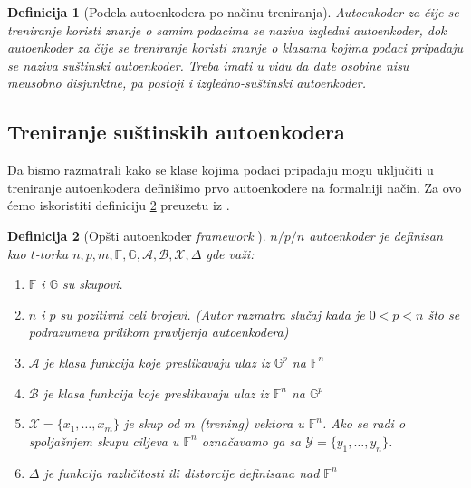 \documentclass{article}
\newtheorem{definition}{Definicija}
\begin{document}
	\begin{definition}[Podela autoenkodera po na\v cinu treniranja]
		\label{autoencoder-training-based-types}
		Autoenkoder za \v cije se treniranje koristi znanje o samim podacima se naziva \emph{izgledni autoenkoder}, dok autoenkoder za \v cije se treniranje koristi znanje o klasama kojima podaci pripadaju se naziva \emph{su\v stinski autoenkoder}. Treba imati u vidu da date osobine nisu me\dj usobno disjunktne, pa postoji i \emph{izgledno-su\v stinski autoenkoder}.
	\end{definition}


	\subsection{Treniranje su\v stinskih autoenkodera}
	\label{treniranje-sustinskih-autoenkodera}
	
	Da bismo razmatrali kako se klase kojima podaci pripadaju mogu uklju\v citi u treniranje autoenkodera defini\v simo prvo autoenkodere na formalniji na\v cin. 
	Za ovo \'cemo iskoristiti definiciju \ref{general-autoencoder-framework} preuzetu iz \cite[Poglavlje 2]{pmlr-v27-baldi12a}.
	
	\begin{definition}[Op\v sti autoenkoder \textit{framework} \cite{pmlr-v27-baldi12a}]
		\label{general-autoencoder-framework}
		\sloppy $n/p/n$ autoenkoder je definisan kao $t$-torka $n, p, m, \mathbb{F}, \mathbb{G}, \mathcal{A}, \mathcal{B}, \mathcal{X}, \Delta$ gde va\v zi:
		\begin{enumerate}
			\addtolength{\itemindent}{1em}
			\item $\mathbb{F}$ i $\mathbb{G}$ su skupovi.
			\item $n$ i $p$ su pozitivni celi brojevi. (Autor razmatra slu\v caj kada je $0 < p < n$ \v sto se podrazumeva prilikom pravljenja autoenkodera)
			\item $\mathcal{A}$ je klasa funkcija koje preslikavaju ulaz iz  $\mathbb{G}^p$ na $\mathbb{F}^n$
			\item $\mathcal{B}$ je klasa funkcija koje preslikavaju ulaz iz $\mathbb{F}^n$ na $\mathbb{G}^p$
			\item $\mathcal{X} = \{x_1, \ldots, x_m\}$ je skup od $m$ (trening) vektora u $\mathbb{F}^n$. Ako se radi o spolja\v snjem skupu ciljeva u $\mathbb{F}^n$ ozna\v cavamo ga sa $\mathcal{Y} = \{y_1, \ldots, y_n\}$.
			\item $\Delta$ je funkcija razli\v citosti ili distorcije definisana nad $\mathbb{F}^n$
		\end{enumerate}
	\end{definition}
	
\end{document}
